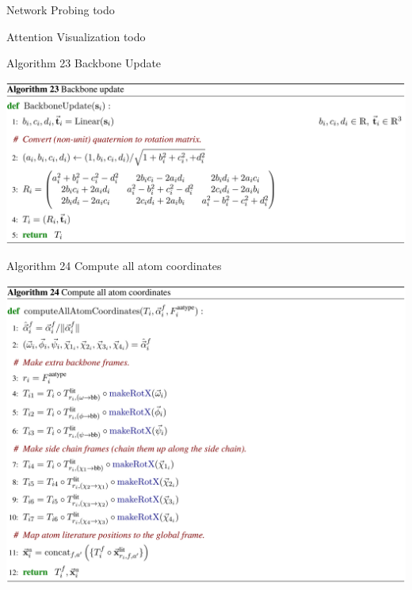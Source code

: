 \documentclass[presentation, smaller]{beamer}
\begin{document}
\begin{frame}[label={sec:org0cb40bf}]{Network Probing}
  todo~\cite{jumperHighlyAccurateProtein2021}
\end{frame}

\begin{frame}[label={sec:org3755e82}]{Attention Visualization}
  todo~\cite{jumperHighlyAccurateProtein2021}
\end{frame}

\begin{frame}[label={sec:org5bfad73}]{Algorithm 23 Backbone Update \cite{jumperHighlyAccurateProtein2021}}
  \begin{center}
    \includegraphics[height=\textheight]{./imgs/backbone-update-algo.png}
  \end{center}
\end{frame}

\begin{frame}[label={sec:org32fd4d8}]{Algorithm 24 Compute all atom coordinates \cite{jumperHighlyAccurateProtein2021}}
  \begin{center}
    \includegraphics[height=\textheight]{./imgs/all-atom-coords-algo.png}
  \end{center}
\end{frame}
\end{document}
